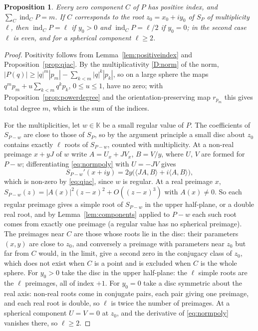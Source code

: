 \documentclass[11pt]{amsart}
\numberwithin{equation}{section}
\theoremstyle{plain}
\newtheorem{proposition}[theorem]{Proposition}
\theoremstyle{definition}
\theoremstyle{remark}
\newcommand{\K}{\mathbb{K}}
\begin{document}
\begin{proposition}\label{prop:normmult}
Every zero component $C$ of $P$ has positive index, and $\sum_C\operatorname{ind}_CP=m$. If $C$ corresponds to the root $z_0=x_0+iy_0$ of $S_P$ of multiplicity $\ell$, then $\operatorname{ind}_CP=\ell$ if $y_0>0$ and $\operatorname{ind}_CP=\ell/2$ if $y_0=0$; in the second case $\ell$ is even, and for a spherical component $\ell\ge2$.
\end{proposition}

\begin{proof}
Positivity follows from Lemma~\ref{lem:positiveindex} and Proposition~\ref{prop:qjac}. By the multiplicativity \ref{D:norm} of the norm, $|P(q)|\ge|q|^m|p_m|-\sum_{k<m}|q|^k|p_k|$, so on a large sphere the maps $q^mp_m+u\sum_{k<m}q^kp_k$, $0\le u\le1$, have no zero; with Proposition~\ref{prop:powerdegree} and the orientation-preserving map $r_{p_m}$ this gives total degree $m$, which is the sum of the indices.

For the multiplicities, let $w\in\K$ be a small regular value of $P$. The coefficients of $S_{P-w}$ are close to those of $S_P$, so by the argument principle a small disc about $z_0$ contains exactly $\ell$ roots of $S_{P-w}$, counted with multiplicity. At a non-real preimage $x+yJ$ of $w$ write $A=U_x+JV_x$, $B=V/y$, where $U$, $V$ are formed for $P-w$; differentiating \eqref{eq:normpoly} with $U=-JV$ gives
\begin{equation}\label{eq:normderiv}
S_{P-w}'(x+iy)=2y\bigl(\langle JA,B\rangle+i\langle A,B\rangle\bigr),
\end{equation}
which is non-zero by \eqref{eq:qjac}, since $w$ is regular. At a real preimage $x$, $S_{P-w}(z)=|A(x)|^2(z-x)^2+O((z-x)^3)$ with $A(x)\neq0$. So each regular preimage gives a simple root of $S_{P-w}$ in the upper half-plane, or a double real root, and by Lemma~\ref{lem:components} applied to $P-w$ each such root comes from exactly one preimage (a regular value has no spherical preimage). The preimages near $C$ are those whose roots lie in the disc: their parameters $(x,y)$ are close to $z_0$, and conversely a preimage with parameters near $z_0$ but far from $C$ would, in the limit, give a second zero in the conjugacy class of $z_0$, which does not exist when $C$ is a point and is excluded when $C$ is the whole sphere. For $y_0>0$ take the disc in the upper half-plane: the $\ell$ simple roots are the $\ell$ preimages, all of index $+1$. For $y_0=0$ take a disc symmetric about the real axis: non-real roots come in conjugate pairs, each pair giving one preimage, and each real root is double, so $\ell$ is twice the number of preimages. At a spherical component $U=V=0$ at $z_0$, and the derivative of \eqref{eq:normpoly} vanishes there, so $\ell\ge2$.
\end{proof}
\end{document}
